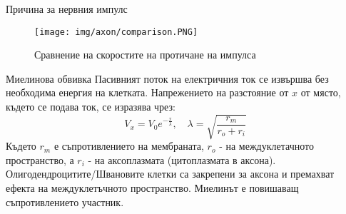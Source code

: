 \begin{frame}[t]{Причина за нервния импулс}
  \begin{figure}[htbp!]
    \centering
    \texttt{[image: img/axon/comparison.PNG]}
    \caption{Сравнение на скоростите на протичане на импулса \cite[Фиг 3.14]{Neuroscience}}
  \end{figure}
\end{frame}

\begin{frame}[t]{Миелинова обвивка}
  Пасивният поток на електричния ток се извършва без необходима енергия на клетката.
  Напрежението на разстояние от $x$ от място, където се подава ток, се изразява чрез:
  \begin{equation*}
    V_x=V_0 e^{-\frac{x}{\lambda}}, \quad \lambda=\sqrt{\frac{r_m}{r_o+r_i}}
  \end{equation*}
  Където $r_m$ е съпротивлението на мембраната, $r_o$ - на междуклетачното пространство, а $r_i$ - на аксоплазмата (цитоплазмата в аксона).
  Олигодендроцитите/Швановите клетки са закрепени за аксона и премахват ефекта на междуклетъчното пространство.
  Миелинът е повишаващ съпротивлението участник.
\end{frame}
